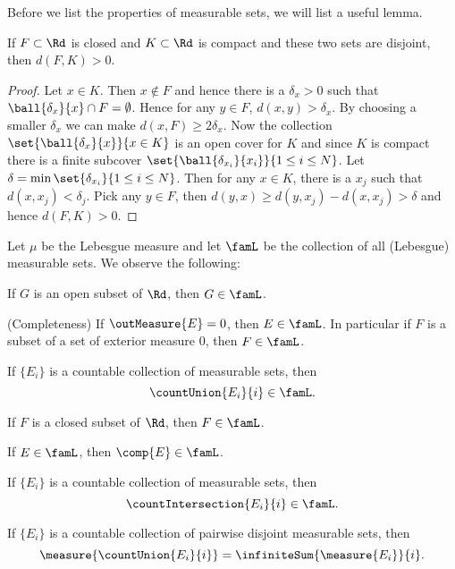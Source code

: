 Before we list the properties of measurable sets, we will list a useful lemma.
\begin{Lemma}
    If $F \subset \Rd$ is closed and $K \subset \Rd$ is compact and these two sets are disjoint, then
    $d(F,K) > 0$.
\end{Lemma}
\begin{proof}
    Let $x \in K$. Then $x \not\in F$ and hence there is a $\delta_x > 0$ such that $\ball{\delta_x}{x}\cap
    F = \emptyset$. Hence for any $y \in F$, $d(x,y) > \delta_x$. By choosing a smaller $\delta_x$ we can make
    $d(x,F) \geq 2\delta_x$. Now the collection $\set{\ball{\delta_x}{x}}{x\in K}$ is an open cover for $K$
    and since $K$ is compact there is a finite subcover $\set{\ball{\delta_{x_i}}{x_i}}{1\leq i\leq N}$. Let
    $\delta = \min\set{\delta_{x_i}}{1\leq i \leq N}$. Then for any $x \in K$, there is a $x_j$ such that
    $d(x,x_j) < \delta_j$. Pick any $y\in F$, then $d(y,x) \geq d(y,x_j) - d(x,x_j) > \delta$ and hence
    $d(F,K) > 0$.	
\end{proof}
\begin{Theorem}[name=Properties of Lebesgue (volume) measure]\label{thm:prop_leb_meas_rn}
    Let $\mu$ be the Lebesgue measure and let $\famL$ be the collection of all (Lebesgue) measurable sets. 
    We observe the following:
    \begin{properties}
    \item
	If $G$ is an open subset of $\Rd$, then $G \in \famL$.
    \item
	(Completeness) If $\outMeasure{E} = 0$, then $E \in \famL$. In particular if $F$ is a 
	subset of a set of exterior measure $0$, then $F \in \famL$.
    \item
	If $\lbrace E_i \rbrace$ is a countable collection of measurable sets, then
	\[\countUnion{E_i}{i} \in \famL.\]
    \item
	If $F$ is a closed subset of $\Rd$, then $F \in \famL$.
    \item
	If $E \in \famL$, then $\comp{E} \in \famL$. 
    \item
	If $\lbrace E_i \rbrace$ is a countable collection of measurable sets, then
	\[\countIntersection{E_i}{i} \in \famL.\]
    \item
	If $\lbrace E_i \rbrace$ is a countable collection of pairwise disjoint measurable sets, then
	\[\measure{\countUnion{E_i}{i}} = \infiniteSum{\measure{E_i}}{i}.\]
    \end{properties}
\end{Theorem}



















